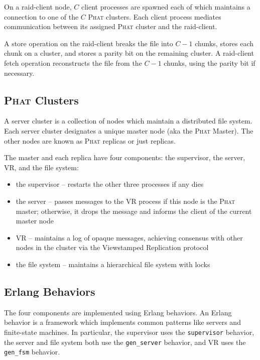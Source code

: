 \documentclass[10pt,letter]{article}
\newcommand{\phat}[0]{\textsc{Phat}}
\begin{document}
On a raid-client node, $C$ client processes are spawned each of which
maintains a connection to one of the $C$ \phat{} clusters. Each client process
mediates communication between its assigned \phat{} cluster and the raid-client.

A store operation on the raid-client breaks the file into $C-1$ chunks, stores
each chunk on a cluster, and stores a parity bit on the remaining cluster. A
raid-client fetch operation reconstructs the file from the $C-1$ chunks, using
the parity bit if necessary.

\subsection{\phat{} Clusters}

A server cluster is a collection of nodes which maintain a distributed file
system. Each server cluster designates a unique master node (aka the \phat{}
Master). The other nodes are known as \phat{} replicas or just replicas.

The master and each replica have four components: the supervisor, the server,
VR, and the file system:

\begin{itemize}
\item the supervisor -- restarts the other three processes if any dies
\item the server -- passes messages to the VR process if this node is the
  \phat{} master; otherwise, it drops the message and informs the client of the
  current master node
\item VR -- maintains a log of opaque messages, achieving consensus with other
  nodes in the cluster via the Viewstamped Replication protocol
\item the file system -- maintains a hierarchical file system with locks
\end{itemize}

\subsection{Erlang Behaviors}

The four components are implemented using Erlang behaviors. An Erlang behavior
is a framework which implements common patterns like servers and finite-state
machines. In particular, the supervisor uses the \texttt{supervisor} behavior,
the server and file system both use the \texttt{gen\_server} behavior, and VR
uses the \texttt{gen\_fsm} behavior.
\end{document}
